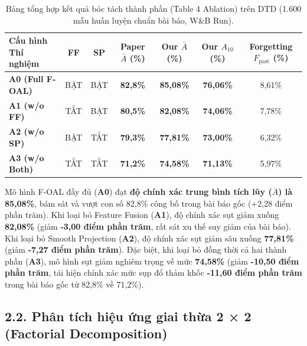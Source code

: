 \documentclass{article}
\begin{document}
\begin{table}[!htb]
\centering
\caption{Bảng tổng hợp kết quả bóc tách thành phần (Table 4 Ablation) trên DTD (1.600 mẫu huấn luyện chuẩn bài báo, W\&B Run).}
\label{tab:dtd_ablation}
\begin{tabular}{lcccccc}
\toprule
\textbf{Cấu hình Thí nghiệm} & \textbf{FF} & \textbf{SP} & \textbf{Paper $\bar{A}$ (\%)} & \textbf{Our $\bar{A}$ (\%)} & \textbf{Our $A_{10}$ (\%)} & \textbf{Forgetting $F_{\text{past}}$ (\%)} \\
\midrule
\textbf{A0 (Full F-OAL)}     & BẬT  & BẬT  & \textbf{82,8\%} & \textbf{85,08\%} & \textbf{76,06\%} & 8,61\% \\
\textbf{A1 (w/o FF)}         & TẮT  & BẬT  & \textbf{80,5\%} & \textbf{82,08\%} & \textbf{74,06\%} & 7,78\% \\
\textbf{A2 (w/o SP)}         & BẬT  & TẮT  & \textbf{79,3\%} & \textbf{77,81\%} & \textbf{73,00\%} & 6,32\% \\
\textbf{A3 (w/o Both)}       & TẮT  & TẮT  & \textbf{71,2\%} & \textbf{74,58\%} & \textbf{71,13\%} & 5,97\% \\
\bottomrule
\end{tabular}
\end{table}

Mô hình F-OAL đầy đủ (\textbf{A0}) đạt \textbf{độ chính xác trung bình tích lũy ($\bar{A}$) là 85,08\%}, bám sát và vượt con số 82,8\% công bố trong bài báo gốc (+2,28 điểm phần trăm). Khi loại bỏ Feature Fusion (\textbf{A1}), độ chính xác sụt giảm xuống \textbf{82,08\%} (giảm \textbf{-3,00 điểm phần trăm}, rất sát xu thế suy giảm của bài báo). Khi loại bỏ Smooth Projection (\textbf{A2}), độ chính xác sụt giảm sâu xuống \textbf{77,81\%} (giảm \textbf{-7,27 điểm phần trăm}). Đặc biệt, khi loại bỏ đồng thời cả hai thành phần (\textbf{A3}), mô hình sụt giảm nghiêm trọng về mức \textbf{74,58\%} (giảm \textbf{-10,50 điểm phần trăm}, tái hiện chính xác mức sụp đổ thảm khốc \textbf{-11,60 điểm phần trăm} trong bài báo gốc từ 82,8\% về 71,2\%).

\subsection{2.2. Phân tích hiệu ứng giai thừa 2 × 2 (Factorial Decomposition)}
\end{document}
